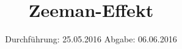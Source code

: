 


\subject{Versuchsprotokoll}
\title{Zeeman-Effekt}
\date{
  Durchführung: 25.05.2016
  \hspace{3em}
  Abgabe: 06.06.2016
}




\maketitle
\thispagestyle{empty}







\printbibliography


